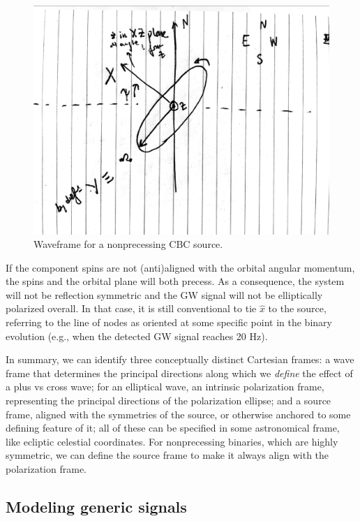 \documentclass[aps,prd,twocolumn,superscriptaddress,preprintnumbers,floatfix,nofootinbib]{revtex4-2}
\begin{document}
\begin{figure}
\includegraphics[width=\columnwidth]{waveframe}
\caption{Waveframe for a nonprecessing CBC source.}
\label{fig:waveframe}
\end{figure}

If the component spins are not (anti)aligned with the orbital angular momentum, the spins and the orbital plane will both precess.
As a consequence, the system will not be reflection symmetric and the GW signal will not be elliptically polarized overall.
In that case, it is still conventional to tie $\hat{x}$ to the source, referring to the line of nodes as oriented at some specific point in the binary evolution (e.g., when the detected GW signal reaches 20 Hz).

In summary, we can identify three conceptually distinct Cartesian frames: a wave frame that determines the principal directions along which we \emph{define} the effect of a plus vs cross wave; for an elliptical wave, an intrinsic polarization frame, representing the principal directions of the polarization ellipse; and a source frame, aligned with the symmetries of the source, or otherwise anchored to some defining feature of it; all of these can be specified in some astronomical frame, like ecliptic celestial coordinates.
For nonprecessing binaries, which are highly symmetric, we can define the source frame to make it always align with the polarization frame.

\subsection{Modeling generic signals}
\end{document}
